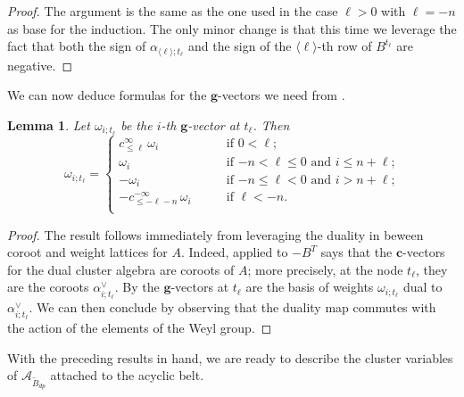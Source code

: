 \documentclass[12pt]{amsart}
\newcommand{\cA}{\mathcal{A}}
\newcommand{\bfc}{\mathbf{c}}
\newcommand{\bfg}{\mathbf{g}}
\newcommand{\cv}{\alpha}
\newcommand{\gv}{\omega}
\renewcommand{\mod}[1]{\langle {#1} \rangle}
\newcommand{\Bdp}{\widetilde{B}_{dp}}
\newcommand{\Zidx}{\ell}
\newtheorem{lemma}[theorem]{Lemma}
\theoremstyle{remark}
\numberwithin{equation}{section}
\numberwithin{figure}{section}
\begin{document}
\begin{proof}
  \noindent{\bf Case $\Zidx < -n$.}
  The argument is the same as the one used in the case $\Zidx>0$ with $\Zidx=-n$ as base for the induction.
  The only minor change is that this time we leverage the fact that both the sign of $\cv_{\mod{\Zidx};t_\Zidx}$ and the sign of the $\mod{\Zidx}$-th row of $B^{t_\Zidx}$ are negative.
\end{proof}

We can now deduce formulas for the $\bfg$-vectors we need from .

\begin{lemma}
  \label{lemma:g-vectors}
  Let $\gv_{i;t_\Zidx}$ be the $i$-th $\bfg$-vector at $t_\Zidx$.
  Then
  \begin{equation}
    \gv_{i;t_\Zidx}
    =
    \begin{cases}
      c^\infty_{\le\Zidx}\, \omega_i & \text{if $0<\Zidx$;}\\
      \omega_i & \text{if $-n < \Zidx \leq 0$ and  $i\leq n+\Zidx$;} \\
      -\omega_i & \text{if $-n\leq \Zidx < 0$ and $i>n+\Zidx$;} \\
      -c^{-\infty}_{\le-\Zidx-n}\, \omega_i \qquad & \text{if $\Zidx <-n$.}\\
    \end{cases}
  \end{equation}
\end{lemma}
\begin{proof}
  The result follows immediately from  leveraging the duality in beween coroot and weight lattices for $A$.
  Indeed,  applied to $-B^T$ says that the $\bfc$-vectors for the dual cluster algebra are coroots of $A$; more precisely, at the node $t_\Zidx$, they are the coroots $\cv_{i;t_\Zidx}^\vee$.
  By  the $\bfg$-vectors at $t_\Zidx$ are the basis of weights $\gv_{i;t_\Zidx}$ dual to $\cv_{i;t_\Zidx}^\vee$.
  We can then conclude by observing that the duality map commutes with the action of the elements of the Weyl group.
\end{proof}

With the preceding results in hand, we are ready to describe the cluster variables of $\cA_{\Bdp}$ attached to the acyclic belt.
\end{document}
